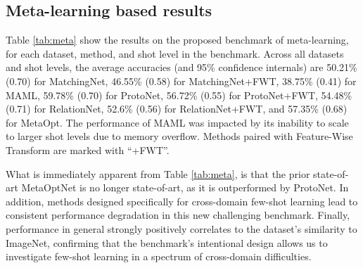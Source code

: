 \documentclass[runningheads]{llncs}
\begin{document}
\subsection{Meta-learning based results}
\label{subsec:meta}
Table \ref{tab:meta} show the results on the proposed benchmark of meta-learning, for each dataset, method, and shot level in the benchmark. Across all datasets and shot levels, the average accuracies (and 95\% confidence internals) are 50.21\% (0.70) for MatchingNet, 46.55\% (0.58) for MatchingNet+FWT, 38.75\% (0.41) for MAML, 59.78\% (0.70) for ProtoNet, 56.72\% (0.55) for ProtoNet+FWT, 54.48\% (0.71) for RelationNet, 52.6\% (0.56) for RelationNet+FWT, and 57.35\% (0.68) for MetaOpt. The performance of MAML was impacted by its inability to scale to larger shot levels due to memory overflow. Methods paired with Feature-Wise Transform are marked with ``+FWT''.  

What is immediately apparent from Table \ref{tab:meta}, is that the prior state-of-art MetaOptNet is no longer state-of-art, as it is outperformed by ProtoNet. In addition, methods designed specifically for cross-domain few-shot learning lead to consistent performance degradation in this new challenging benchmark. Finally, performance in general strongly positively correlates to the dataset's similarity to ImageNet, confirming that the benchmark's intentional design allows us to investigate few-shot learning in a spectrum of cross-domain difficulties. 
\end{document}
